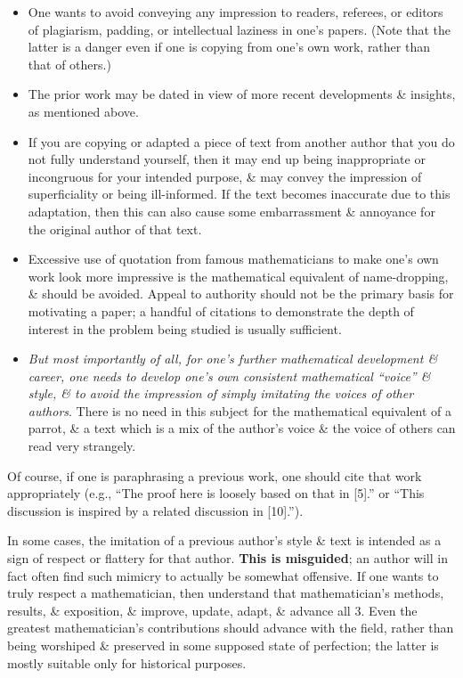 \documentclass[oneside]{book}
\numberwithin{equation}{section}
\begin{document}
\begin{itemize}
	\item One wants to avoid conveying any impression to readers, referees, or editors of plagiarism, padding, or intellectual laziness in one's papers. (Note that the latter is a danger even if one is copying from one's own work, rather than that of others.)
	\item The prior work may be dated in view of more recent developments \& insights, as mentioned above.
	\item If you are copying or adapted a piece of text from another author that you do not fully understand yourself, then it may end up being inappropriate or incongruous for your intended purpose, \& may convey the impression of superficiality or being ill-informed. If the text becomes inaccurate due to this adaptation, then this can also cause some embarrassment \& annoyance for the original author of that text.
	\item Excessive use of quotation from famous mathematicians to make one's own work look more impressive is the mathematical equivalent of name-dropping, \& should be avoided. Appeal to authority should not be the primary basis for motivating a paper; a handful of citations to demonstrate the depth of interest in the problem being studied is usually sufficient.
	\item \textit{But most importantly of all, for one's further mathematical development \& career, one needs to develop one's own consistent mathematical ``voice'' \& style, \& to avoid the impression of simply imitating the voices of other authors}. There is no need in this subject for the mathematical equivalent of a parrot, \& a text which is a mix of the author's voice \& the voice of others can read very strangely.
\end{itemize}
Of course, if one is paraphrasing a previous work, one should cite that work appropriately (e.g., ``The proof here is loosely based on that in [5].'' or ``This discussion is inspired by a related discussion in [10].'').

In some cases, the imitation of a previous author's style \& text is intended as a sign of respect or flattery for that author. \textbf{This is misguided}; an author will in fact often find such mimicry to actually be somewhat offensive. If one wants to truly respect a mathematician, then understand that mathematician's methods, results, \& exposition, \& improve, update, adapt, \& advance all 3. Even the greatest mathematician's contributions should advance with the field, rather than being worshiped \& preserved in some supposed state of perfection; the latter is mostly suitable only for historical purposes.
\end{document}
